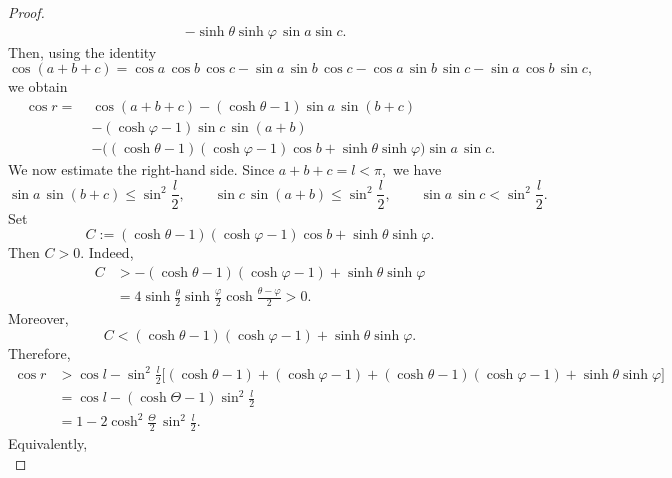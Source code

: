 \documentclass[hidelinks,12pt,a4paper]{article}
\numberwithin{equation}{section}
\theoremstyle{plain}
\theoremstyle{definition}
\begin{document}
\begin{proof}
\begin{equation*}
\begin{aligned}
&-\sinh\theta\sinh\varphi\,\sin a\sin c.
\end{aligned}
\end{equation*}
Then, using the identity
\begin{equation*}
\cos(a+b+c)
=
\cos a\,\cos b\,\cos c
-\sin a\,\sin b\,\cos c
-\cos a\,\sin b\,\sin c
-\sin a\,\cos b\,\sin c,
\end{equation*}
we obtain
\begin{equation*}
\begin{aligned}
\cos r
=\;&
\cos(a+b+c)
-(\cosh\theta-1)\sin a\,\sin(b+c)\\
&-(\cosh\varphi-1)\sin c\,\sin(a+b)\\
&-\Big((\cosh\theta-1)(\cosh\varphi-1)\cos b
+\sinh\theta\sinh\varphi\Big)\sin a\,\sin c.
\end{aligned}
\end{equation*}
We now estimate the right-hand side. Since $a+b+c=l<\pi,$
we have
\begin{equation*}
\sin a\, \sin(b+c)\leq \sin^2\frac{l}{2},
\qquad
\sin c\, \sin(a+b)\leq \sin^2\frac{l}{2},\qquad \sin a\, \sin c< \sin^2\frac{l}{2}.
\end{equation*}
Set
\begin{equation*}
C:=(\cosh\theta-1)(\cosh\varphi-1)\cos b
+\sinh\theta\sinh\varphi.
\end{equation*}
Then $C > 0$. Indeed,
\begin{equation*}
\begin{aligned}
C&>
-(\cosh\theta-1)(\cosh\varphi-1)
+\sinh\theta\sinh\varphi\\
&=
4\sinh\frac\theta2\sinh\frac{\varphi}{2}
\cosh\frac{\theta-\varphi}{2}
>0.
\end{aligned}
\end{equation*}
Moreover, 
\begin{equation*}
C<(\cosh\theta-1)(\cosh\varphi-1)
+\sinh\theta\sinh\varphi.
\end{equation*}
Therefore,
\begin{equation*}
\begin{aligned}
\cos r
&>
\cos l-\sin^2\frac{l}{2}
\Big[(\cosh\theta-1)+(\cosh\varphi-1)
+(\cosh\theta-1)(\cosh\varphi-1)
+\sinh\theta\sinh\varphi\Big]\\
&=\cos l-(\cosh\Theta-1)\sin^2\frac{l}{2}\\
&=1-2\cosh^2\frac{\Theta}{2}\,\sin^2\frac{l}{2}.
\end{aligned}
\end{equation*}
Equivalently,
\begin{equation*}

\end{equation*}
\end{proof}
\end{document}
